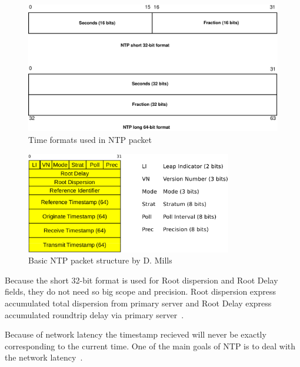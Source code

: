 \begin{figure}
	\centering
	\includegraphics[width=13cm,keepaspectratio]{fig/ntp-timestamps.pdf}
	\caption{Time formats used in NTP packet}
	\label{fig:ntp-timestamps}
	\bigskip
\end{figure}


\begin{figure}
	\centering
	\includegraphics[width=9cm,keepaspectratio]{fig/ntp-packet.pdf}
	\caption{Basic NTP packet structure by D. Mills}
	\label{fig:ntp-packet}
	\bigskip
\end{figure}


Because the short 32-bit format is used for Root dispersion and Root Delay fields,
they do not need so big scope and precision.
Root dispersion express accumulated total dispersion from primary server
and Root Delay express accumulated roundtrip delay via primary server~\cite{ntp-arch}.


Because of network latency the timestamp recieved will never be exactly corresponding to
the current time.
One of the main goals of NTP is to deal with the network latency~\cite{ntp-overview}.
